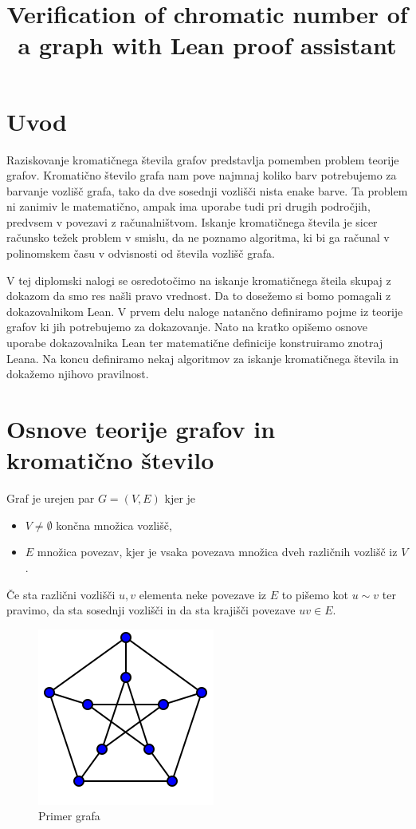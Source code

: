 \documentclass[mat1]{fmfdelo}
\title{Verification of chromatic number of a graph with Lean proof assistant}
\begin{document}
\section{Uvod}
Raziskovanje kromatičnega števila grafov predstavlja pomemben problem teorije grafov.
Kromatično število grafa nam pove najmnaj koliko barv potrebujemo za barvanje vozlišč grafa, tako da dve sosednji vozlišči nista enake barve.
Ta problem ni zanimiv le matematično, ampak ima uporabe tudi pri drugih področjih, predvsem v povezavi z računalništvom. 
Iskanje kromatičnega števila je sicer računsko težek problem v smislu, da ne poznamo algoritma, ki bi ga računal v polinomskem času v odvisnosti od števila vozlišč grafa.

V tej diplomski nalogi se osredotočimo na iskanje kromatičnega šteila skupaj z dokazom da smo res našli pravo vrednost.
Da to dosežemo si bomo pomagali z dokazovalnikom Lean.
V prvem delu naloge natančno definiramo pojme iz teorije grafov ki jih potrebujemo za dokazovanje. Nato na kratko opišemo osnove uporabe dokazovalnika
Lean ter matematične definicije konstruiramo znotraj Leana. 
Na koncu definiramo nekaj algoritmov za iskanje kromatičnega števila in dokažemo njihovo pravilnost. 


\section{Osnove teorije grafov in kromatično število}

\begin{definicija}
    Graf je urejen par $G=(V, E)$ kjer je 
    \begin{itemize}
      \item $V\neq \emptyset$ končna množica vozlišč,
      \item $E$ množica povezav, kjer je vsaka povezava množica dveh različnih vozlišč iz $V$. 
    \end{itemize}
\end{definicija}
Če sta različni vozlišči $u, v$ elementa neke povezave iz $E$ to pišemo kot $u\sim v$ ter pravimo, da sta sosednji vozlišči in da sta krajišči povezave $uv\in E$.

\begin{figure}[H]
\begin{center}
\includegraphics[scale=1]{assets/graph}
\caption{Primer grafa}
\label{slika2}
\end{center}
\end{figure}
\end{document}
